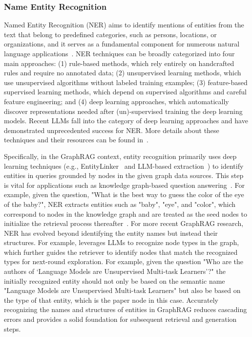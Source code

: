 \subsubsection{Name Entity Recognition} \label{sec-ner}
Named Entity Recognition (NER) aims to identify mentions of entities from the text that belong to predefined categories, such as persons, locations, or organizations, and it serves as a fundamental component for numerous natural language applications~\cite{huang2021few, keraghel2024survey, li2020survey, meng2021distantly}. NER techniques can be broadly categorized into four main approaches: (1) rule-based methods, which rely entirely on handcrafted rules and require no annotated data; (2) unsupervised learning methods, which use unsupervised algorithms without labeled training examples; (3) feature-based supervised learning methods, which depend on supervised algorithms and careful feature engineering; and (4) deep learning approaches, which automatically discover representations needed after (un)-supervised training the deep learning models. Recent LLMs fall into the category of deep learning approaches and have demonstrated unprecedented success for NER. More details about these techniques and their resources can be found in~\citet{li2020survey}. 

Specifically, in the GraphRAG context, entity recognition primarily uses deep learning techniques (e.g., EntityLinker~\cite{tian2024graph, yasunaga2022deep} and LLM-based extraction~\cite{jin2024graph}) to identify entities in queries grounded by nodes in the given graph data sources. This step is vital for applications such as knowledge graph-based question answering~\cite{tian2024graph, yasunaga2021qa, yasunaga2022deep}. For example, given the question, "What is the best way to guess the color of the eye of the baby?", NER extracts entities such as "baby", "eye", and "color", which correspond to nodes in the knowledge graph and are treated as the seed nodes to initialize the retrieval process thereafter~\cite{wen2023mindmap, sanmartin2024kg}. For more recent GraphRAG research, NER has evolved beyond identifying the entity names but instead their structures. For example, \citet{jin2024graph} leverages LLMs to recognize node types in the graph, which further guides the retriever to identify nodes that match the recognized types for next-round exploration. For example, given the question "Who are the authors of `Language Models are Unsupervised Multi-task Learners'?" the initially recognized entity should not only be based on the semantic name "Language Models are Unsupervised Multi-task Learners" but also be based on the type of that entity, which is the paper node in this case. Accurately recognizing the names and structures of entities in GraphRAG reduces cascading errors and provides a solid foundation for subsequent retrieval and generation steps. 



